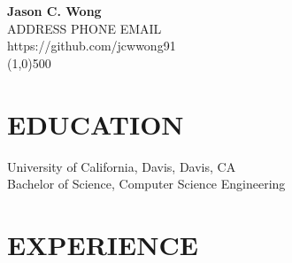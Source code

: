 \documentclass{res}
\begin{document}
 

{\centering
	\Large{\bf Jason C. Wong} \\
	\normalsize
	{{ADDRESS}} \hspace{1pt} \textbullet \hspace{1pt}
	{{PHONE}}
	\hspace{1pt} \textbullet \hspace{1pt} {{EMAIL}} \\
	https://github.com/jcwwong91 \\
	\footnotesize
	\line(1,0){500} \\
}

\normalsize
\begin{resume}

\vspace{-15pt}
\section{EDUCATION}          
    University of California, Davis, Davis, CA  \\        
    Bachelor of Science, Computer Science Engineering  

\vspace{-10pt}
\section{EXPERIENCE}
   \vspace{-0.1in}	
   

\end{resume}
\end{document}
